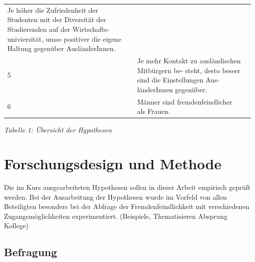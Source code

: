 \documentclass[]{article}
\begin{document}
\begin{longtable}[]{@{}lll@{}}
\begin{minipage}[t]{0.59\columnwidth}
Je höher die Zufriedenheit der Studenten mit der Diversität der
Studierenden auf der Wirtschafts- univiersität, umso positiver die
eigene Haltung gegenüber AusländerInnen.\strut
\end{minipage} & \begin{minipage}[t]{0.23\columnwidth}\raggedright\strut
\strut
\end{minipage}\tabularnewline
\begin{minipage}[t]{0.09\columnwidth}\raggedright\strut
5\strut
\end{minipage} & \begin{minipage}[t]{0.59\columnwidth}\raggedright\strut
Je mehr Kontakt zu ausländischen Mitbürgern be- steht, desto besser sind
die Einstellungen Aus- länderInnen gegenüber.\strut
\end{minipage} & \begin{minipage}[t]{0.23\columnwidth}\raggedright\strut
\strut
\end{minipage}\tabularnewline
\begin{minipage}[t]{0.09\columnwidth}\raggedright\strut
6\strut
\end{minipage} & \begin{minipage}[t]{0.59\columnwidth}\raggedright\strut
Männer sind fremdenfeindlicher als Frauen.\strut
\end{minipage} & \begin{minipage}[t]{0.23\columnwidth}\raggedright\strut
\strut
\end{minipage}\tabularnewline
\bottomrule
\end{longtable}

\begin{center}
\textit{Tabelle 1: Übersicht der Hypothesen}
\bigskip
\end{center}

\section{Forschungsdesign und Methode}

Die im Kurs ausgearbeiteten Hypothesen sollen in dieser Arbeit empirisch
geprüft werden. Bei der Ausarbeitung der Hypothesen wurde im Vorfeld von
allen Beteiligten besonders bei der Abfrage der Fremdenfeindlichkeit mit
verschiedenen Zugangsmöglichkeiten experimentiert. (Beispiele,
Thematisieren Absprung Kollege)

\subsection{Befragung}\label{befragung}
\end{document}
